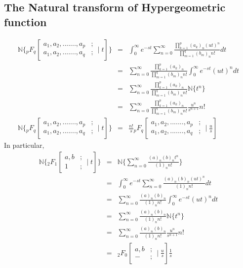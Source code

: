  \subsection{The Natural transform of Hypergeometric function}
\begin{eqnarray*}
\mathbb{N}\lbrace {}_p F_q\left[ 
  \begin{array}{cc}
  a_1, a_2,.......,a_p&;\\
  a_1, a_2,.......,a_q&; 
  \end{array}
 \mid{t} \right]\rbrace &=& \int_{0}^{\infty}e^{-st} \sum_{n=0}^{\infty} \frac{\prod_{k=1}^{p}(a_{k})_{n}(ut)^{n}}{\prod_{m=1}^{q}(b_{m})_{n}n!} dt\\
 &=& \sum_{n=0}^{\infty} \frac{\prod_{k=1}^{p}(a_{k})_{n}}{\prod_{m=1}^{q}(b_{m})_{n}n!}\int_{0}^{\infty}e^{-st}(ut)^{n}dt\\ 
 &=&{ \sum_{n=0}^{\infty} \frac{\prod_{k=1}^{p}(a_{k})_{n}}{\prod_{m=1}^{q}(b_{m})_{n}n!}}\mathbb{N}\lbrace t^{n} \rbrace \\ 
&=&{ \sum_{n=0}^{\infty} \frac{\prod_{k=1}^{p}(a_{k})_{n}}{\prod_{m=1}^{q}(b_{m})_{n}n!}}\frac{u^{n}}{s^{n+1}}n!\\
\mathbb{N}\lbrace {}_p F_q\left[ 
  \begin{array}{cc}
  a_1, a_2,.......,a_p&;\\
  a_1, a_2,.......,a_q&; 
  \end{array}
 \mid{t}
 \right]\rbrace &=& \frac{n!}{s}{}_p F_q\left[ 
  \begin{array}{cc}
  a_1, a_2,.......,a_p&;\\
  a_1, a_2,.......,a_q&; 
  \end{array}
 \mid{\frac{u}{s}}
 \right]
 \end{eqnarray*}
 In particular,
   \begin{eqnarray*}
   \mathbb{N}\lbrace {}_2 F_1\left[ 
  \begin{array}{cc}
  a,b&;\\
   1&; 
  \end{array}
 \mid{t}\right]\rbrace &=&\mathbb{N}\lbrace   \sum_{n=0}^{\infty} \frac{(a)_{n}(b)_{n}t^{n}}{(1)_{n}n!}\rbrace\\
 &=&\int_{0}^{\infty}e^{-st}\sum_{n=0}^{\infty} \frac{(a)_{n}(b)_{n}(ut)^{n}}{(1)_{n}n!}dt\\ 
  &=& \sum_{n=0}^{\infty} \frac{(a)_{n}(b)_{n}}{(1)_{n}n!}\int_{0}^{\infty}e^{-st}(ut)^{n}dt \\  
  &=&\sum_{n=0}^{\infty} \frac{(a)_{n}(b)_{n}}{(1)_{n}n!}\mathbb{N}\lbrace t^{n}\rbrace\\  
    &=& \sum_{n=0}^{\infty} \frac{(a)_{n}(b)_{n}}{(1)_{n}n!}\frac{u^{n}}{s^{n+1}}n!\\    
   &=& {}_2 F_0\left[ 
  \begin{array}{cc}
  a,b&;\\
   - &; 
  \end{array}
 \mid{\frac{u}{s}}\right]\frac{1}{s}
 \end{eqnarray*}
